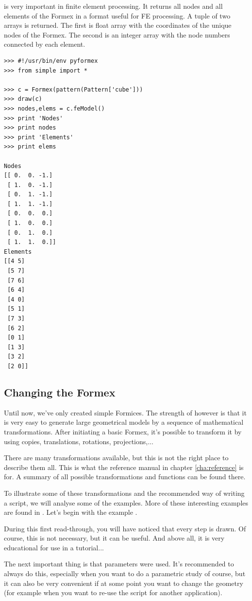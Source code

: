 { is very important in finite element processing. It returns all nodes and all elements of the Formex in a format useful for FE processing. A tuple of two arrays is returned. The first is float array with the coordinates of the unique nodes of the Formex. The second is an integer array with the node numbers connected by each element.
\begin{verbatim}
>>> #!/usr/bin/env pyformex
>>> from simple import *

>>> c = Formex(pattern(Pattern['cube']))
>>> draw(c)
>>> nodes,elems = c.feModel()
>>> print 'Nodes'
>>> print nodes
>>> print 'Elements'
>>> print elems

Nodes
[[ 0.  0. -1.]
 [ 1.  0. -1.]
 [ 0.  1. -1.]
 [ 1.  1. -1.]
 [ 0.  0.  0.]
 [ 1.  0.  0.]
 [ 0.  1.  0.]
 [ 1.  1.  0.]]
Elements
[[4 5]
 [5 7]
 [7 6]
 [6 4]
 [4 0]
 [5 1]
 [7 3]
 [6 2]
 [0 1]
 [1 3]
 [3 2]
 [2 0]]
\end{verbatim}

\subsection{Changing the Formex}
\label{subsec:changing}
Until now, we've only created simple Formices. The strength of \pyformex however is that it is very easy to generate large geometrical models by a sequence of mathematical transformations. After initiating a basic Formex, it's possible to transform it by using copies, translations, rotations, projections,...

There are many transformations available, but this is not the right place to describe them all. This is what the reference manual in chapter \ref{cha:reference} is for. A summary of all possible transformations and functions can be found there.

To illustrate some of these transformations and the recommended way of writing a script, we will analyse some of the examples. More of these interesting examples are found in . Let's begin with the example . 



During this first read-through, you will have noticed that every step is drawn. Of course, this is not necessary, but it can be useful. And above all, it is very educational for use in a tutorial...

The next important thing is that parameters were used. It's recommended to always do this, especially when you want to do a parametric study of course, but it can also be very convenient if at some point you want to change the geometry (for example when you want to re-use the script for another application).

}
